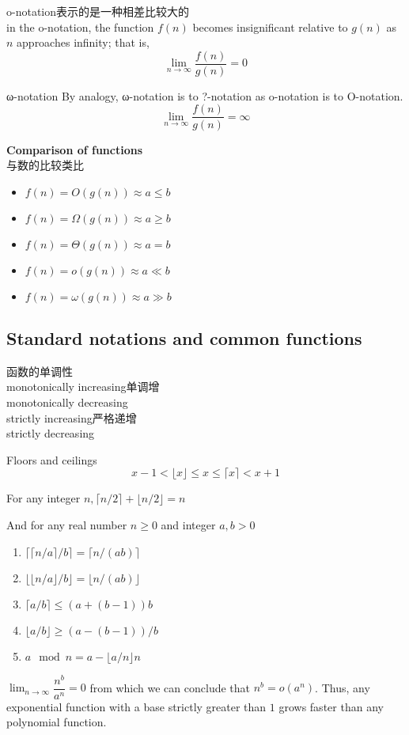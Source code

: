 \documentclass{article}
\begin{document}
o-notation表示的是一种相差比较大的\\
in the o-notation, the function $f(n)$ becomes insignificant relative to $g(n)$ as $n$ approaches infinity; that is,
$$\lim_{n \to \infty} \frac{f(n)}{g(n)} = 0 $$

ω-notation
By analogy, ω-notation is to ?-notation as o-notation is to O-notation.
$$ \lim_{n \to \infty} \frac{f(n)}{g(n)} = \infty $$

\textbf{Comparison of functions}\\
与数的比较类比
\begin{itemize}
	\item $f(n) = O(g(n))	\approx	a \leq b$
	\item $f(n) = \Omega(g(n))	\approx a \geq b$
	\item $f(n) = \Theta(g(n))	\approx	a = b$
	\item $f(n) = o(g(n))	\approx	a \ll b$
	\item $f(n) = \omega(g(n))	\approx	a \gg b$
\end{itemize}

\subsection{Standard notations and common functions}
函数的单调性\\
monotonically increasing单调增\\
monotonically decreasing\\
strictly increasing严格递增\\
strictly decreasing

Floors and ceilings
$$
x -1 < \lfloor x \rfloor \leq x \leq \lceil x \rceil < x + 1
$$

For any integer $n, \lceil n/2 \rceil + \lfloor n/2 \rfloor = n$

And for any real number $n \geq 0$ and integer $a,b >0$
\begin{enumerate}
	\item $\lceil \lceil n/a \rceil /b \rceil = \lceil n/(ab) \rceil$
	\item $\lfloor \lfloor n/a \rfloor /b \rfloor = \lfloor n/(ab) \rfloor$
	\item $\lceil a/b \rceil \leq (a+(b-1))b$
	\item $\lfloor a/b \rfloor \geq (a-(b-1))/b$
	\item $a \mod n = a - \lfloor a/n \rfloor n$
\end{enumerate}

$\lim_{n \to \infty} \dfrac{n^b}{a^n} = 0$
from which we can conclude that
$n^b = o(a^n)$.
Thus, any exponential function with a base strictly greater than $1$ grows faster than any polynomial function.
\end{document}

